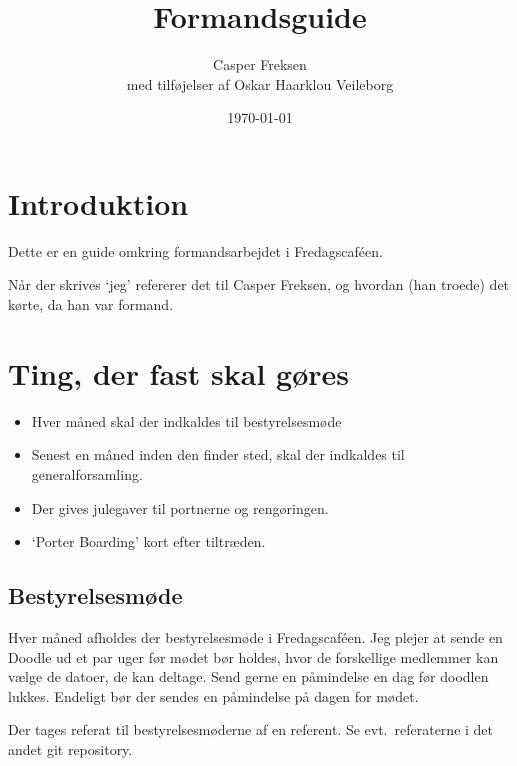 

\title{Formandsguide}
\date{\today}
\author{Casper Freksen\\
\small med tilføjelser af Oskar Haarklou Veileborg}



\maketitle

\section{Introduktion}
\label{sec:introduktion}

Dette er en guide omkring formandsarbejdet i Fredagscaféen.

Når der skrives `jeg' refererer det til Casper Freksen, og hvordan
(han troede) det kørte, da han var formand.

\section{Ting, der fast skal gøres}
\label{sec:ting-der-skal}

\begin{itemize}
\item Hver måned skal der indkaldes til bestyrelsesmøde
\item Senest en måned inden den finder sted, skal der indkaldes til
  generalforsamling.
\item Der gives julegaver til portnerne og rengøringen.
\item `Porter Boarding' kort efter tiltræden.
\end{itemize}

\subsection{Bestyrelsesmøde}
\label{sec:bestyrelsesmode}

Hver måned afholdes der bestyrelsesmøde i Fredagscaféen. Jeg plejer at
sende en Doodle ud et par uger før mødet bør holdes, hvor de forskellige medlemmer kan
vælge de datoer, de kan deltage. Send gerne en påmindelse en dag før doodlen
lukkes. Endeligt bør der sendes en påmindelse på dagen for mødet.

Der tages referat til bestyrelsesmøderne af en referent. Se
evt.~referaterne i det andet git repository.

